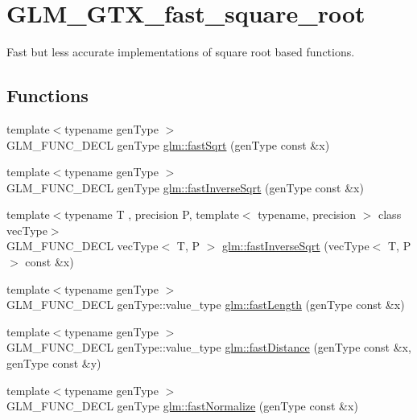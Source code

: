 \hypertarget{group__gtx__fast__square__root}{}\section{G\+L\+M\+\_\+\+G\+T\+X\+\_\+fast\+\_\+square\+\_\+root}
\label{group__gtx__fast__square__root}


Fast but less accurate implementations of square root based functions.  


\subsection*{Functions}
\begin{DoxyCompactItemize}
\item 
{\footnotesize template$<$typename gen\+Type $>$ }\\G\+L\+M\+\_\+\+F\+U\+N\+C\+\_\+\+D\+E\+CL gen\+Type \hyperlink{group__gtx__fast__square__root_gab07ddede2731f3438d687a652c843673}{glm\+::fast\+Sqrt} (gen\+Type const \&x)
\item 
{\footnotesize template$<$typename gen\+Type $>$ }\\G\+L\+M\+\_\+\+F\+U\+N\+C\+\_\+\+D\+E\+CL gen\+Type \hyperlink{group__gtx__fast__square__root_ga65237d716748c6262f316ec1eaf7f073}{glm\+::fast\+Inverse\+Sqrt} (gen\+Type const \&x)
\item 
{\footnotesize template$<$typename T , precision P, template$<$ typename, precision $>$ class vec\+Type$>$ }\\G\+L\+M\+\_\+\+F\+U\+N\+C\+\_\+\+D\+E\+CL vec\+Type$<$ T, P $>$ \hyperlink{group__gtx__fast__square__root_ga903878071f92e51e551791e584a171a1}{glm\+::fast\+Inverse\+Sqrt} (vec\+Type$<$ T, P $>$ const \&x)
\item 
{\footnotesize template$<$typename gen\+Type $>$ }\\G\+L\+M\+\_\+\+F\+U\+N\+C\+\_\+\+D\+E\+CL gen\+Type\+::value\+\_\+type \hyperlink{group__gtx__fast__square__root_ga70aa3c80d8bb22e021c6c3ebdcf8e3ee}{glm\+::fast\+Length} (gen\+Type const \&x)
\item 
{\footnotesize template$<$typename gen\+Type $>$ }\\G\+L\+M\+\_\+\+F\+U\+N\+C\+\_\+\+D\+E\+CL gen\+Type\+::value\+\_\+type \hyperlink{group__gtx__fast__square__root_ga69778792fcadc29f586efa3ec2118cdc}{glm\+::fast\+Distance} (gen\+Type const \&x, gen\+Type const \&y)
\item 
{\footnotesize template$<$typename gen\+Type $>$ }\\G\+L\+M\+\_\+\+F\+U\+N\+C\+\_\+\+D\+E\+CL gen\+Type \hyperlink{group__gtx__fast__square__root_ga3b02c1d6e0c754144e2f1e110bf9f16c}{glm\+::fast\+Normalize} (gen\+Type const \&x)
\end{DoxyCompactItemize}


